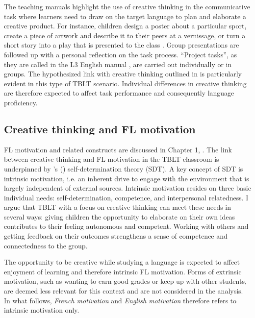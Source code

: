 \documentclass[output=paper]{langsci/langscibook}
\begin{document}
The teaching manuals highlight the use of creative thinking in the communicative task where learners need to draw on the target language to plan and elaborate a creative product. For instance, children design a poster about a particular sport, create a piece of artwork and describe it to their peers at a vernissage, or turn a short story into a play that is presented to the class \citep{ArnetClarkEtAl2013}. Group presentations are followed up with a personal reflection on the task process. ``Project tasks'', as they are called in the L3 English manual \citep{ArnetClarkEtAl2013}, are carried out individually or in groups. The hypothesized link with creative thinking outlined in  is particularly evident in this type of TBLT scenario. Individual differences in creative thinking are therefore expected to affect task performance and consequently language proficiency. 

\subsection{Creative thinking and FL motivation}\label{sec:06:2.5}

FL motivation and related constructs are discussed in Chapter 1, . The link between creative thinking and FL motivation in the TBLT classroom is underpinned by \citeauthor{DeciRyan1985}'s (\citeyear{DeciRyan1985,DeciRyan2002}) self-determination theory (SDT). A key concept of SDT is intrinsic motivation, i.e. an inherent drive to engage with the environment that is largely independent of external sources. Intrinsic motivation resides on three basic individual needs: self-determination, competence, and interpersonal relatedness. I argue that TBLT with a focus on creative thinking can meet these needs in several ways: giving children the opportunity to elaborate on their own ideas contributes to their feeling autonomous and competent. Working with others and getting feedback on their outcomes strengthens a sense of competence and connectedness to the group.

The opportunity to be creative while studying a language is expected to affect enjoyment of learning and therefore intrinsic FL motivation. Forms of extrinsic motivation, such as wanting to earn good grades or keep up with other students, are deemed less relevant for this context and are not considered in the analysis. In what follows, \textit{French motivation} and \textit{English motivation} therefore refers to intrinsic motivation only. 
\end{document}
